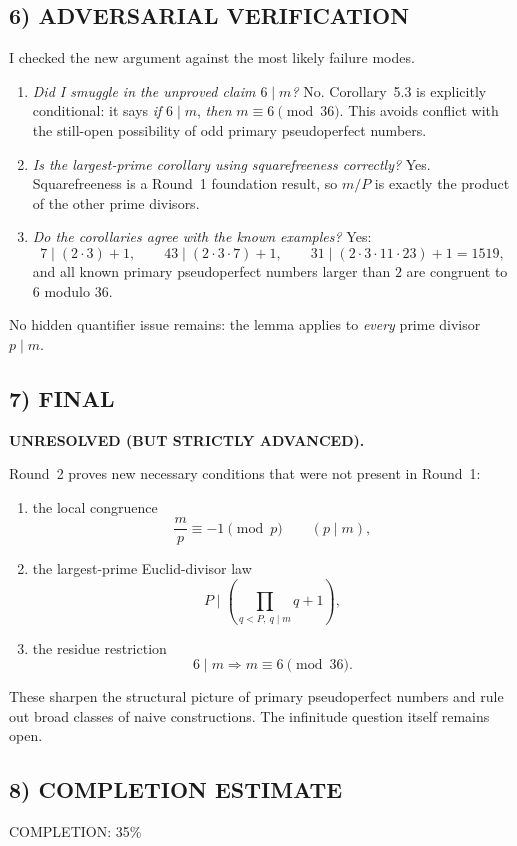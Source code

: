 \subsection*{6) ADVERSARIAL VERIFICATION}
I checked the new argument against the most likely failure modes.
\begin{enumerate}
\item \emph{Did I smuggle in the unproved claim $6\mid m$?}  No.  Corollary~5.3 is explicitly conditional: it says \emph{if} $6\mid m$, \emph{then} $m\equiv 6\pmod{36}$.  This avoids conflict with the still-open possibility of odd primary pseudoperfect numbers.
\item \emph{Is the largest-prime corollary using squarefreeness correctly?}  Yes.  Squarefreeness is a Round~1 foundation result, so $m/P$ is exactly the product of the other prime divisors.
\item \emph{Do the corollaries agree with the known examples?}  Yes:
\[
7\mid (2\cdot 3)+1,
\qquad
43\mid (2\cdot 3\cdot 7)+1,
\qquad
31\mid (2\cdot 3\cdot 11\cdot 23)+1=1519,
\]
and all known primary pseudoperfect numbers larger than $2$ are congruent to $6$ modulo $36$.
\end{enumerate}
No hidden quantifier issue remains: the lemma applies to \emph{every} prime divisor $p\mid m$.

\subsection*{7) FINAL}
\textbf{UNRESOLVED (BUT STRICTLY ADVANCED).}

Round~2 proves new necessary conditions that were not present in Round~1:
\begin{enumerate}
\item the local congruence
\[
\frac{m}{p}\equiv -1\pmod p \qquad (p\mid m),
\]
\item the largest-prime Euclid-divisor law
\[
P\mid \left(\prod_{q<P,\ q\mid m} q +1\right),
\]
\item the residue restriction
\[
6\mid m \Longrightarrow m\equiv 6\pmod{36}.
\]
\end{enumerate}
These sharpen the structural picture of primary pseudoperfect numbers and rule out broad classes of naive constructions.  The infinitude question itself remains open.

\subsection*{8) COMPLETION ESTIMATE}
COMPLETION: 35\%

